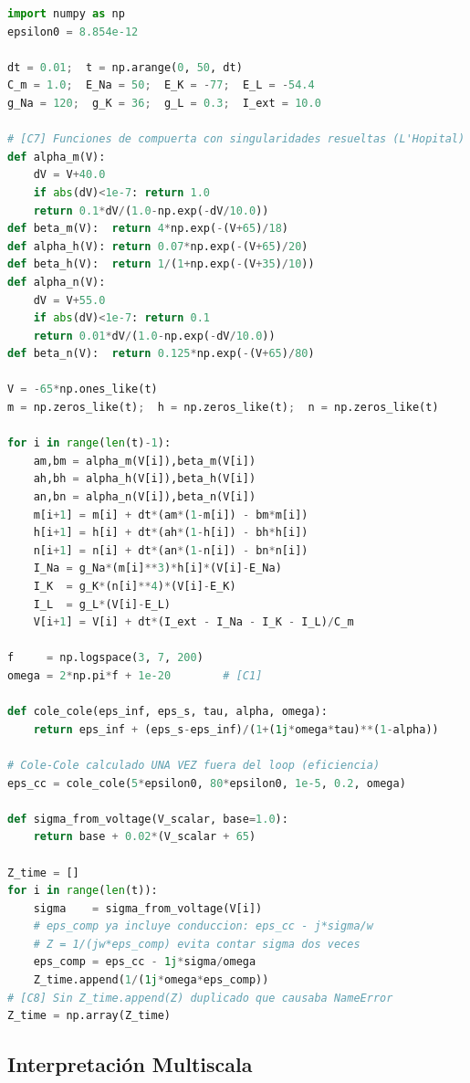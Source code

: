\documentclass[12pt]{article}
\begin{document}
\begin{lstlisting}[language=Python, caption={Implementaci\'on del modelo de Hodgkin--Huxley y c\'alculo de $Z(\omega, t)$.}]
import numpy as np
epsilon0 = 8.854e-12

dt = 0.01;  t = np.arange(0, 50, dt)
C_m = 1.0;  E_Na = 50;  E_K = -77;  E_L = -54.4
g_Na = 120;  g_K = 36;  g_L = 0.3;  I_ext = 10.0

# [C7] Funciones de compuerta con singularidades resueltas (L'Hopital)
def alpha_m(V):
    dV = V+40.0
    if abs(dV)<1e-7: return 1.0
    return 0.1*dV/(1.0-np.exp(-dV/10.0))
def beta_m(V):  return 4*np.exp(-(V+65)/18)
def alpha_h(V): return 0.07*np.exp(-(V+65)/20)
def beta_h(V):  return 1/(1+np.exp(-(V+35)/10))
def alpha_n(V):
    dV = V+55.0
    if abs(dV)<1e-7: return 0.1
    return 0.01*dV/(1.0-np.exp(-dV/10.0))
def beta_n(V):  return 0.125*np.exp(-(V+65)/80)

V = -65*np.ones_like(t)
m = np.zeros_like(t);  h = np.zeros_like(t);  n = np.zeros_like(t)

for i in range(len(t)-1):
    am,bm = alpha_m(V[i]),beta_m(V[i])
    ah,bh = alpha_h(V[i]),beta_h(V[i])
    an,bn = alpha_n(V[i]),beta_n(V[i])
    m[i+1] = m[i] + dt*(am*(1-m[i]) - bm*m[i])
    h[i+1] = h[i] + dt*(ah*(1-h[i]) - bh*h[i])
    n[i+1] = n[i] + dt*(an*(1-n[i]) - bn*n[i])
    I_Na = g_Na*(m[i]**3)*h[i]*(V[i]-E_Na)
    I_K  = g_K*(n[i]**4)*(V[i]-E_K)
    I_L  = g_L*(V[i]-E_L)
    V[i+1] = V[i] + dt*(I_ext - I_Na - I_K - I_L)/C_m

f     = np.logspace(3, 7, 200)
omega = 2*np.pi*f + 1e-20        # [C1]

def cole_cole(eps_inf, eps_s, tau, alpha, omega):
    return eps_inf + (eps_s-eps_inf)/(1+(1j*omega*tau)**(1-alpha))

# Cole-Cole calculado UNA VEZ fuera del loop (eficiencia)
eps_cc = cole_cole(5*epsilon0, 80*epsilon0, 1e-5, 0.2, omega)

def sigma_from_voltage(V_scalar, base=1.0):
    return base + 0.02*(V_scalar + 65)

Z_time = []
for i in range(len(t)):
    sigma    = sigma_from_voltage(V[i])
    # eps_comp ya incluye conduccion: eps_cc - j*sigma/w
    # Z = 1/(jw*eps_comp) evita contar sigma dos veces
    eps_comp = eps_cc - 1j*sigma/omega
    Z_time.append(1/(1j*omega*eps_comp))
# [C8] Sin Z_time.append(Z) duplicado que causaba NameError
Z_time = np.array(Z_time)
\end{lstlisting}

\subsection{Interpretaci\'on Multiscala}
\end{document}
